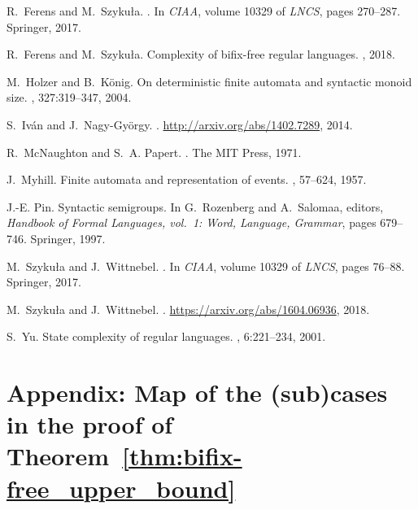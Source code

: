 \documentclass{amsart}
\begin{document}
\begin{thebibliography}{10}
R.~Ferens and M.~Szyku{\l}a.
.
\newblock In {\em CIAA}, volume 10329 of {\em LNCS}, pages 270--287. Springer,
  2017.

R.~Ferens and M.~Szyku{\l}a.
\newblock Complexity of bifix-free regular languages.
, 2018.

M.~Holzer and B.~K\"onig.
\newblock On deterministic finite automata and syntactic monoid size.
, 327:319--347, 2004.

S.~Iv{\'{a}}n and J.~Nagy{-}Gy{\"{o}}rgy.
.
\newblock \url{http://arxiv.org/abs/1402.7289}, 2014.

R.~McNaughton and S.~A. Papert.
.
\newblock The MIT Press, 1971.

J.~Myhill.
\newblock Finite automata and representation of events.
, 57--624, 1957.

J.-E. Pin.
\newblock Syntactic semigroups.
\newblock In G.~Rozenberg and A.~Salomaa, editors, {\em Handbook of Formal
  Languages, vol.~1: Word, Language, Grammar}, pages 679--746. Springer, 1997.

M.~Szyku{\l}a and J.~Wittnebel.
.
\newblock In {\em CIAA}, volume 10329 of {\em LNCS}, pages 76--88. Springer,
  2017.

M.~Szyku{\l}a and J.~Wittnebel.
.
\newblock \url{https://arxiv.org/abs/1604.06936}, 2018.

S.~Yu.
\newblock State complexity of regular languages.
, 6:221--234, 2001.

\end{thebibliography}
\newpage
\section*{Appendix: Map of the (sub)cases in the proof of Theorem~\ref{thm:bifix-free_upper_bound}}
\end{document}
